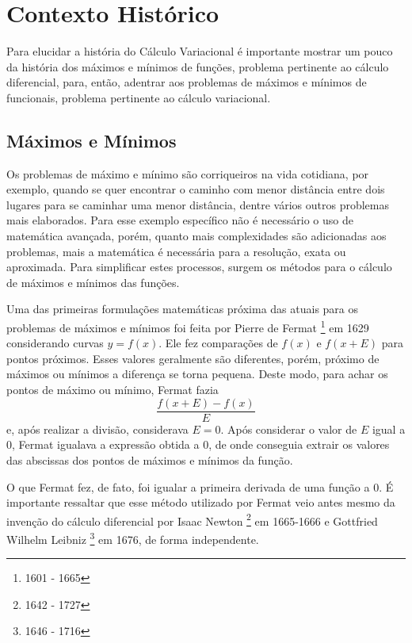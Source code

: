 \documentclass[
	12pt,				%
	openright,			%
    twoside,			%
	a4paper,			%
	english,			%
	french,				%
	spanish,			%
	brazil				%
	]{abntex2}
\numberwithin{lema}{chapter}
\numberwithin{teorema}{chapter}
\numberwithin{definicao}{chapter}
\numberwithin{exemplo}{chapter}
\numberwithin{figure}{chapter}
\newcommand{\bdDate}[2]{
	\footnote{\gtrsymBorn\text{ }#1 - \gtrsymDied\text{ }#2}
}
\begin{document}
\chapter{Contexto Histórico}

Para elucidar a história do Cálculo Variacional é importante mostrar um pouco da história dos máximos e mínimos de funções, problema pertinente ao cálculo diferencial, para, então, adentrar aos problemas de máximos e mínimos de funcionais, problema pertinente ao cálculo variacional.

\section{Máximos e Mínimos}

Os problemas de máximo e mínimo são corriqueiros na vida cotidiana, por exemplo, quando se quer encontrar o caminho com menor distância entre dois lugares para se caminhar uma menor distância, dentre vários outros problemas mais elaborados. Para esse exemplo específico não é necessário o uso de matemática avançada, porém, quanto mais complexidades são adicionadas aos problemas, mais a matemática é necessária para a resolução, exata ou aproximada. Para simplificar estes processos, surgem os métodos para o cálculo de máximos e mínimos das funções.

Uma das primeiras formulações matemáticas próxima das atuais para os problemas de máximos e mínimos foi feita por Pierre de Fermat\bdDate{1601}{1665} em 1629 considerando curvas $y=f(x)$. Ele fez comparações de $f(x)$ e $f(x+E)$ para pontos próximos. Esses valores geralmente são diferentes, porém, próximo de máximos ou mínimos a diferença se torna pequena. Deste modo, para achar os pontos de máximo ou mínimo, Fermat fazia
$$
	\frac{f(x+E)-f(x)}{E}
$$
e, após realizar a divisão, considerava $E=0$. Após considerar o valor de $E$ igual a $0$, Fermat igualava a expressão obtida a $0$, de onde conseguia extrair os valores das abscissas dos pontos de máximos e mínimos da função. \cite{boyer}

O que Fermat fez, de fato, foi igualar a primeira derivada de uma função a $0$. É importante ressaltar que esse método utilizado por Fermat veio antes mesmo da invenção do cálculo diferencial por Isaac Newton\bdDate{1642}{1727} em 1665-1666 e Gottfried Wilhelm Leibniz\bdDate{1646}{1716} em 1676, de forma independente. \cite{boyer}

\end{document}
